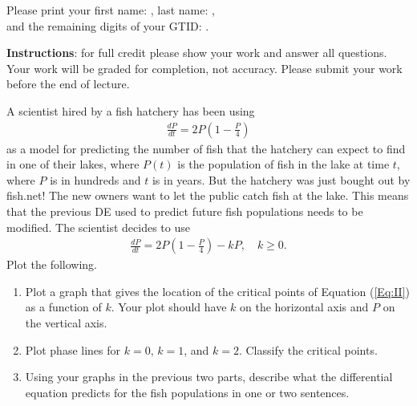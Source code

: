 \documentclass[12pt]{exam}
\begin{document}
    
\vspace*{-1cm}

\begin{center}
{\Large \TestName}
\end{center}
\newcommand{\ID}{Please print your first name: \framebox{\strut\hspace{4.2cm}}, last name: \framebox{\strut\hspace{4.2cm}}, \\[2pt] and the remaining digits of your GTID:  \framebox{\strut $9$}\framebox{\strut $0$}\framebox{\strut\hspace{0.19cm}}\framebox{\strut\hspace{0.19cm}}\framebox{\strut\hspace{0.19cm}}\framebox{\strut\hspace{0.19cm}}\framebox{\strut\hspace{0.19cm}}\framebox{\strut\hspace{0.19cm}}\framebox{\strut\hspace{0.19cm}}.}

\ID

\textbf{Instructions}: for full credit please show your work and answer all questions. Your work will be graded for completion, not accuracy. Please submit your work before the end of lecture. 
\begin{questions}

    \question[4] A scientist hired by a fish hatchery has been using \begin{align}
        \frac{dP}{dt}=2P\left(1-\frac{P}{4}\right)
    \end{align} as a model for predicting the number of fish that the hatchery can expect to find in one of their lakes, where $P(t)$ is the population of fish in the lake at time $t$, where $P$ is in hundreds and $t$ is in years. But the hatchery was just bought out by fish.net! The new owners want to let the public catch fish at the lake. This means that the previous DE used to predict future fish populations needs to be modified. The scientist decides to use 
\begin{align}
    \frac{dP}{dt}=2P\left(1-\frac{P}{4}\right) - kP, \quad k  \ge 0. \label{Eq:II}
\end{align}
Plot the following. 
\begin{enumerate}[label=\alph*)]
        \item Plot a graph that gives the location of the critical points of Equation (\ref{Eq:II}) as a function of $k$. Your plot should have $k$ on the horizontal axis and $P$ on the vertical axis.
        \item Plot phase lines for $k=0$, $k=1$, and $k=2$. Classify the critical points. 
        \item Using your graphs in the previous two parts, describe what the differential equation predicts for the fish populations in one or two sentences. 
    \end{enumerate}

\vfill 

\end{questions}
\end{document}
